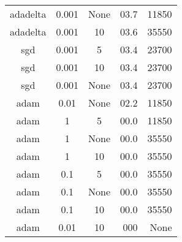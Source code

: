 \begin{table}
\begin{tabular}{|c|c|c|r|r|}
	 adadelta &     0.001     & None        & 03.7 & 11850 \\
	 adadelta &     0.001     &       10        & 03.6 & 35550 \\
	   sgd    &     0.001     &        5        & 03.4 & 23700 \\
	   sgd    &     0.001     &       10        & 03.4 & 23700 \\
	   sgd    &     0.001     & None        & 03.4 & 23700 \\
	   adam   &      0.01     & None        & 02.2 & 11850 \\
	   adam   &       1       &        5        & 00.0 & 11850 \\
	   adam   &       1       & None        & 00.0 & 35550 \\
	   adam   &       1       &       10        & 00.0 & 35550 \\
	   adam   &      0.1      &        5        & 00.0 & 35550 \\
	   adam   &      0.1      & None        & 00.0 & 35550 \\
	   adam   &      0.1      &       10        & 00.0 & 35550 \\
	   adam   &      0.01     &       10        & 000 &  None \\
	\hline
\end{tabular}
\end{table}
